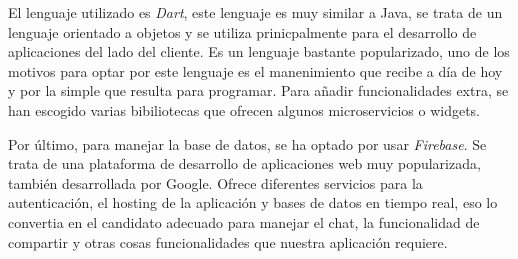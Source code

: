 \documentclass[a4paper, 12pt]{article}
\begin{document}
El lenguaje utilizado es \textit{Dart}, este lenguaje es muy similar a Java, se trata de un lenguaje orientado a objetos y se utiliza prinicpalmente para el desarrollo de aplicaciones del lado del cliente. Es un lenguaje bastante popularizado, uno de los motivos para optar por este lenguaje es el manenimiento que recibe a día de hoy y por la simple que resulta para programar. Para añadir funcionalidades extra, se han escogido varias bibiliotecas que ofrecen algunos microservicios o widgets.

Por último, para manejar la base de datos, se ha optado por usar \textit{Firebase}. Se trata de una plataforma de desarrollo de aplicaciones web muy popularizada, también desarrollada por Google. Ofrece diferentes servicios para la autenticación, el hosting de la aplicación y bases de datos en tiempo real, eso lo convertia en el candidato adecuado para manejar el chat, la funcionalidad de compartir y otras cosas funcionalidades que nuestra aplicación requiere.
\end{document}
